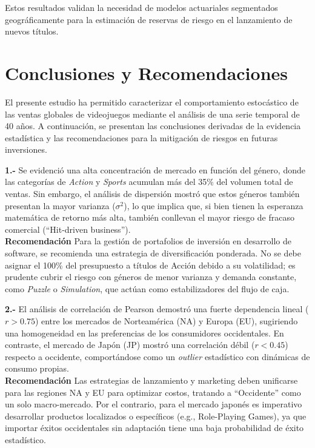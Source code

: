 \documentclass[oneside,11pt]{Latex/Classes/PhDthesisPSnPDF}
\begin{document}
Estos resultados validan la necesidad de modelos actuariales segmentados
geográficamente para la estimación de reservas de riesgo en el
lanzamiento de nuevos títulos.

\chapter{Conclusiones y Recomendaciones}

El presente estudio ha permitido caracterizar el comportamiento
estocástico de las ventas globales de videojuegos mediante el análisis
de una serie temporal de 40 años. A continuación, se presentan las
conclusiones derivadas de la evidencia estadística y las recomendaciones
para la mitigación de riesgos en futuras inversiones.

\textbf{1.-} Se evidenció una alta concentración de mercado en función
del género, donde las categorías de \textit{Action} y \textit{Sports}
acumulan más del 35\% del volumen total de ventas. Sin embargo, el
análisis de dispersión mostró que estos géneros también presentan la
mayor varianza (\(\sigma^2\)), lo que implica que, si bien tienen la
esperanza matemática de retorno más alta, también conllevan el mayor
riesgo de fracaso comercial (``Hit-driven business'').\\

\textbf{Recomendación} Para la gestión de portafolios de inversión en
desarrollo de software, se recomienda una estrategia de diversificación
ponderada. No se debe asignar el 100\% del presupuesto a títulos de
Acción debido a su volatilidad; es prudente cubrir el riesgo con géneros
de menor varianza y demanda constante, como \textit{Puzzle} o
\textit{Simulation}, que actúan como estabilizadores del flujo de caja.

\textbf{2.-} El análisis de correlación de Pearson demostró una fuerte
dependencia lineal (\(r > 0.75\)) entre los mercados de Norteamérica
(NA) y Europa (EU), sugiriendo una homogeneidad en las preferencias de
los consumidores occidentales. En contraste, el mercado de Japón (JP)
mostró una correlación débil (\(r < 0.45\)) respecto a occidente,
comportándose como un \textit{outlier} estadístico con dinámicas de
consumo propias.\\

\textbf{Recomendación} Las estrategias de lanzamiento y marketing deben
unificarse para las regiones NA y EU para optimizar costos, tratando a
``Occidente'' como un solo macro-mercado. Por el contrario, para el
mercado japonés es imperativo desarrollar productos localizados o
específicos (e.g., Role-Playing Games), ya que importar éxitos
occidentales sin adaptación tiene una baja probabilidad de éxito
estadístico.
\end{document}
